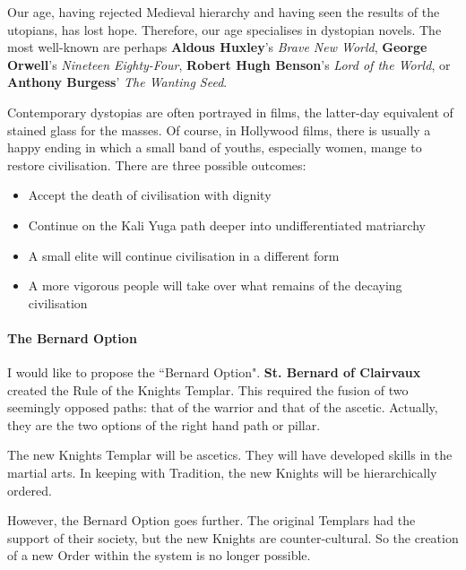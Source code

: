 Our age, having rejected Medieval hierarchy and having seen the results of the utopians, has lost hope. Therefore, our age specialises in dystopian novels. The most well-known are perhaps \textbf{Aldous Huxley}'s \emph{Brave New World}, \textbf{George Orwell}'s \emph{Nineteen Eighty-Four}, \textbf{Robert Hugh Benson}'s \emph{Lord of the World}, or \textbf{Anthony Burgess}' \emph{The Wanting Seed}.

Contemporary dystopias are often portrayed in films, the latter-day equivalent of stained glass for the masses. Of course, in Hollywood films, there is usually a happy ending in which a small band of youths, especially women, mange to restore civilisation. There are three possible outcomes:

\begin{itemize}
\item Accept the death of civilisation with dignity 
\item Continue on the Kali Yuga path deeper into undifferentiated matriarchy 
\item A small elite will continue civilisation in a different form 
\item A more vigorous people will take over what remains of the decaying civilisation 
\end{itemize}
\paragraph{The Bernard Option}
I would like to propose the ``Bernard Option". \textbf{St. Bernard of Clairvaux} created the Rule of the Knights Templar. This required the fusion of two seemingly opposed paths: that of the warrior and that of the ascetic. Actually, they are the two options of the right hand path or pillar.

The new Knights Templar will be ascetics. They will have developed skills in the martial arts. In keeping with Tradition, the new Knights will be hierarchically ordered.

However, the Bernard Option goes further. The original Templars had the support of their society, but the new Knights are counter-cultural. So the creation of a new Order within the system is no longer possible.

